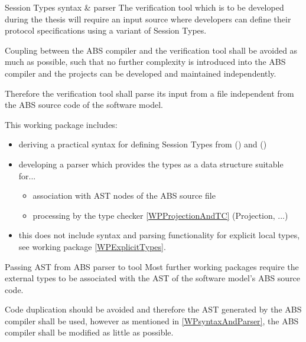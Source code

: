 \documentclass[paper=a4,nochapname,accentcolor=tud9c]{tudexercise}
\makeatletter
\newcommand\textcitep[1]{\mkbibparens{\textcite{#1}}}
\def\namedlabel#1#2{\begingroup
    #1%
    \def\@currentlabel{\thedescriptcount}%
    \phantomsection\label{#2}\endgroup
}
\newcounter{descriptcount}
\renewcommand*\thedescriptcount{[\Alph{descriptcount}]}}
\renewcommand*\thedescriptcount{\roman{descriptcount}}}
\makeatother
\begin{document}
\begin{enumdescript}
\item[\namedlabel{Session Types syntax \& parser}{WPsyntaxAndParser}]%
    The verification tool which is to be developed during the thesis will require
    an input source where developers can define their protocol specifications using a variant of Session Types.

    Coupling between the ABS compiler and the verification tool shall be avoided
    as much as possible, such that no further complexity is introduced into the ABS
    compiler and the projects can be developed and maintained independently.
    
    Therefore the verification tool shall parse its input from a file independent
    from the ABS source code of the software model.

    This working package includes:
    \begin{itemize}
      \item deriving a practical syntax for defining Session Types from \textcitep{kamburjan2018stateful} and \textcitep{kamburjan2016session}
      \item developing a parser which provides the types as a data structure
        suitable for...
      \begin{itemize}
        \item association with AST nodes of the ABS source file
        \item processing by the type checker \ref{WPProjectionAndTC} (Projection, ...)
      \end{itemize}
      \item this does not include syntax and parsing functionality for explicit
        local types, see working package \ref{WPExplicitTypes}.
    \end{itemize}
  \item[\namedlabel{Passing AST from ABS parser to tool}{WPPassAST}]%
    Most further working packages require the external types to be associated with
    the AST of the software model's ABS source code.

    Code duplication should be avoided and therefore the AST generated by the
    ABS compiler shall be used, however as mentioned in \ref{WPsyntaxAndParser},
    the ABS compiler shall be modified as little as possible.


\end{enumdescript}
\end{document}
